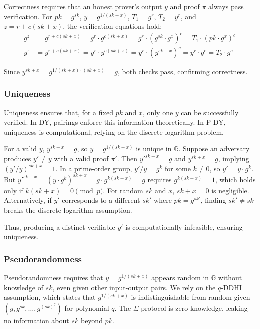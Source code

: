 Correctness requires that an honest prover’s output $y$ and proof $\pi$ always pass verification. For $pk = g^{sk}$, $y = g^{1/(sk + x)}$, $T_1 = g^r$, $T_2 = y^r$, and $z = r + c(sk + x)$, the verification equations hold:
\begin{align*}
g^z &= g^{r + c(sk + x)} = g^r \cdot g^{c(sk + x)} = g^r \cdot (g^{sk} \cdot g^x)^c = T_1 \cdot (pk \cdot g^x)^c \\
y^z &= y^{r + c(sk + x)} = y^r \cdot y^{c(sk + x)} = y^r \cdot (y^{sk + x})^c = y^r \cdot g^c = T_2 \cdot g^c
\end{align*}

Since $y^{sk + x} = g^{1/(sk + x) \cdot (sk + x)} = g$, both checks pass, confirming correctness.

\subsubsection{Uniqueness}

Uniqueness ensures that, for a fixed $pk$ and $x$, only one $y$ can be successfully verified. In DY, pairings enforce this information theoretically. In P-DY, uniqueness is computational, relying on the discrete logarithm problem.

For a valid $y$, $y^{sk + x} = g$, so $y = g^{1/(sk + x)}$ is unique in $\mathbb{G}$. Suppose an adversary produces $y' \neq y$ with a valid proof $\pi'$. Then $y'^{sk + x} = g$ and $y^{sk + x} = g$, implying $(y'/y)^{sk + x} = 1$. In a prime-order group, $y'/y = g^k$ for some $k \neq 0$, so $y' = y \cdot g^k$. But $y'^{sk + x} = (y \cdot g^k)^{sk + x} = g \cdot g^{k(sk + x)} = g$ requires $g^{k(sk + x)} = 1$, which holds only if $k(sk + x) = 0 \pmod{p}$. For random $sk$ and $x$, $sk + x = 0$ is negligible. Alternatively, if $y'$ corresponds to a different $sk'$ where $pk = g^{sk'}$, finding $sk' \neq sk$ breaks the discrete logarithm assumption.

Thus, producing a distinct verifiable $y'$ is computationally infeasible, ensuring uniqueness.

\subsubsection{Pseudorandomness}

Pseudorandomness requires that $y = g^{1/(sk + x)}$ appears random in $\mathbb{G}$ without knowledge of $sk$, even given other input-output pairs. We rely on the $q$-DDHI assumption, which states that $g^{1/(sk + x)}$ is indistinguishable from random given $(g, g^{sk}, \ldots, g^{(sk)^q})$ for polynomial $q$. 
The $\Sigma$-protocol is zero-knowledge, leaking no information about $sk$ beyond $pk$.

